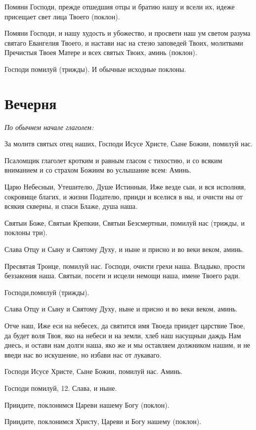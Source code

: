 Помяни Господи, прежде отшедшия отцы и братию нашу и всели их, идеже присещает свет лица Твоего (поклон).

Помяни Господи, и нашу худость и убожество, и просвети наш ум светом разума святаго Евангелия Твоего, и настави нас на стезю заповедей Твоих, молитвами Пречистыя Твоея Матере и всех святых Твоих, аминь (поклон).

Господи помилуй (трижды). И обычные исходные поклоны.


\section{Вечерня}
 


\itshape По обычнем начале глаголем:\normalfont{}


За молитв святых отец наших, Господи Исусе Христе, Сыне Божии, помилуй нас.

Псаломщик глаголет кротким и равным гласом с тихостию, и со всяким вниманием и со страхом Божиим во услышание всем: Аминь.

Царю Небесныи, Утешителю, Душе Истинныи, Иже везде сыи, и вся исполняя, сокровище благих, и жизни Подателю, прииди и вселися в ны, и очисти ны от всякия скверны, и спаси Блаже, душа наша.

Святыи Боже, Святыи Крепкии, Святыи Безсмертныи, помилуй нас (трижды, и поклоны три). 

Слава Отцу и Сыну и Святому Духу, и ныне и присно и во веки веком, аминь.

Пресвятая Троице, помилуй нас. Господи, очисти грехи наша. Владыко, прости беззакония наша. Святыи, посети и исцели немощи наша, имене Твоего ради.

Господи,помилуй (трижды).

Слава Отцу и Сыну и Святому Духу, ныне и присно и во веки веком, аминь.

Отче наш, Иже еси на небесех, да святится имя Твоеда приидет царствие Твое, да будет воля Твоя, яко на небеси и на земли, хлеб наш насущныи даждь Нам днесь, и остави нам долги наша, яко же и мы оставляем должником нашим, и не введи нас во искушение, но избави нас от лукаваго.

Господи Исусе Христе, Сыне Божии, помилуй нас. Аминь.

Господи помилуй, 12. Слава, и ныне.

Приидите, поклонимся Цареви нашему Богу (поклон).

Приидите, поклонимся Христу, Цареви и Богу нашему (поклон).

